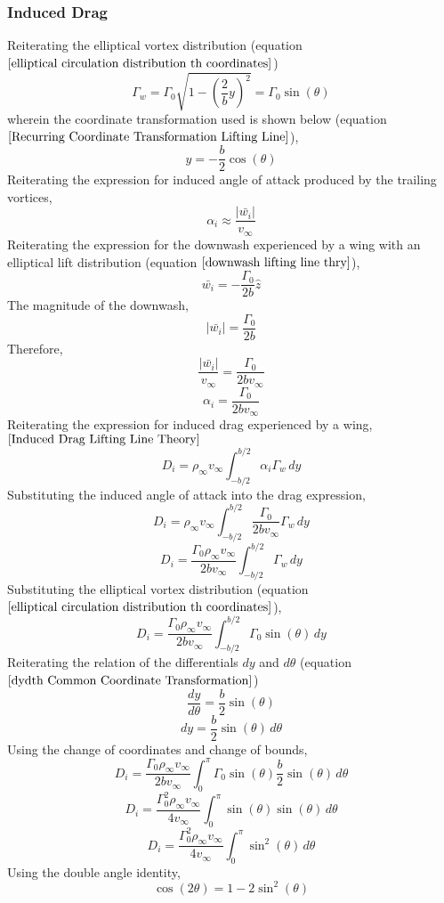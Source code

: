 \documentclass[a4paper, 12pt]{report}
\begin{document}
\begin{center}
\subsubsection{Induced Drag}
\begin{comment}
\end{comment}
Reiterating the elliptical vortex distribution (equation $\ref{elliptical circulation distribution th coordinates}$)
$$\Gamma_{w} = \Gamma_{0}\sqrt{1-\left(\frac{2}{b}y\right)^{2}} = \Gamma_{0}\sin(\theta)$$
wherein the coordinate transformation used is shown below (equation $\ref{Recurring Coordinate Transformation Lifting Line}$),
$$y = -\frac{b}{2}\cos(\theta)$$
Reiterating the expression for induced angle of attack produced by the trailing vortices, 
$$\alpha_{i} \approx \frac{|\bar{w_{i}}|}{v_{\infty}}$$
Reiterating the expression for the downwash experienced by a wing with an elliptical lift distribution (equation $\ref{downwash lifting line thry}$),
$$\bar{w_{i}} = -\frac{\Gamma_{0}}{2b}\hat{z}$$
The magnitude of the downwash,
$$|\bar{w_{i}}| = \frac{\Gamma_{0}}{2b}$$
Therefore,
$$\frac{|\bar{w_{i}}|}{v_{\infty}} = \frac{\Gamma_{0}}{2bv_{\infty}}$$
$$\alpha_{i} = \frac{\Gamma_{0}}{2bv_{\infty}}$$
Reiterating the expression for induced drag experienced by a wing, $\ref{Induced Drag Lifting Line Theory}$
$$D_{i} = \rho_{\infty}v_{\infty}\int^{b/2}_{-b/2}\alpha_{i}\Gamma_{w}\,dy$$
Substituting the induced angle of attack into the drag expression,
$$D_{i} = \rho_{\infty}v_{\infty}\int^{b/2}_{-b/2} \frac{\Gamma_{0}}{2bv_{\infty}} \Gamma_{w}\,dy$$
$$D_{i} = \frac{\Gamma_{0}\rho_{\infty}v_{\infty}}{2bv_{\infty}} \int^{b/2}_{-b/2} \Gamma_{w}\,dy$$
Substituting the elliptical vortex distribution (equation $\ref{elliptical circulation distribution th coordinates}$),
$$D_{i} = \frac{\Gamma_{0}\rho_{\infty}v_{\infty}}{2bv_{\infty}} \int^{b/2}_{-b/2} \Gamma_{0}\sin(\theta) \,dy$$
Reiterating the relation of the differentials $dy$ and $d\theta$ (equation $\ref{dydth Common Coordinate Transformation}$)
$$\frac{dy}{d\theta} = \frac{b}{2}\sin(\theta)$$
$$dy = \frac{b}{2}\sin(\theta)\,d\theta$$
Using the change of coordinates and change of bounds,
$$D_{i} = \frac{\Gamma_{0}\rho_{\infty}v_{\infty}}{2bv_{\infty}} \int^{\pi}_{0} \Gamma_{0}\sin(\theta) \frac{b}{2}\sin(\theta)\,d\theta$$
$$D_{i} = \frac{\Gamma_{0}^{2}\rho_{\infty}v_{\infty}}{4v_{\infty}} \int^{\pi}_{0} \sin(\theta)\sin(\theta) \,d\theta$$
$$D_{i} = \frac{\Gamma_{0}^{2}\rho_{\infty}v_{\infty}}{4v_{\infty}} \int^{\pi}_{0} \sin^{2}(\theta) \,d\theta$$
Using the double angle identity,
$$\cos(2\theta) = 1 - 2\sin^{2}(\theta)$$

\end{center}
\end{document}
